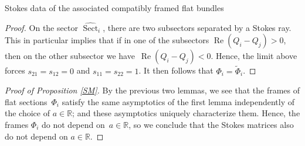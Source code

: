 \documentclass[11pt]{article}
\numberwithin{equation}{section}
\numberwithin{equation}{section}
\begin{document}
\begin{subsubsection}{Stokes data of the associated compatibly framed flat bundles}
\begin{proof}
On the sector $\widehat{\operatorname{Sect}}_i$, there are two subsectors separated by a Stokes ray. This in particular implies that if in one of the subsectors $\operatorname{Re}(Q_i-Q_j)>0$, then on the other subsector we have~${\operatorname{Re}(Q_i-Q_j)<0}$. Hence, the limit above forces $s_{21}=s_{12}=0$ and $s_{11}=s_{22}=1$. It then follows that $\Phi_i=\widetilde{\Phi}_i$.
\end{proof}

\begin{proof}[Proof of Proposition \ref{SM}] By the previous two lemmas, we see that the frames of flat sections~$\Phi_i$ satisfy the same asymptotics of the first lemma independently of the choice of $a\in \mathbb{R}$; and these asymptotics uniquely characterize them. Hence, the frames $\Phi_i$ do not depend on~${a \in \mathbb{R}}$, so we conclude that the Stokes matrices also do not depend on $a\in \mathbb{R}$.
\end{proof}
\end{subsubsection}
\end{document}
